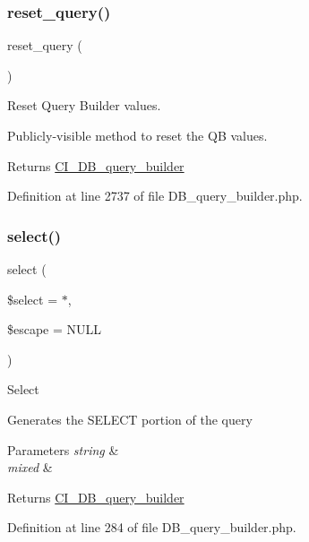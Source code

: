 \subsubsection{\texorpdfstring{reset\_query()}{reset\_query()}}
{\footnotesize\ttfamily reset\+\_\+query (\begin{DoxyParamCaption}{ }\end{DoxyParamCaption})}

Reset Query Builder values.

Publicly-\/visible method to reset the QB values.

\begin{DoxyReturn}{Returns}
\mbox{\hyperlink{class_c_i___d_b__query__builder}{C\+I\+\_\+\+D\+B\+\_\+query\+\_\+builder}} 
\end{DoxyReturn}


Definition at line 2737 of file D\+B\+\_\+query\+\_\+builder.\+php.

\mbox{\label{class_c_i___d_b__query__builder_a406a7ea81e717e56496f61baf3e03f44}} 
\subsubsection{\texorpdfstring{select()}{select()}}
{\footnotesize\ttfamily select (\begin{DoxyParamCaption}\item[{}]{\$select = {\ttfamily \textquotesingle{}$\ast$\textquotesingle{}},  }\item[{}]{\$escape = {\ttfamily NULL} }\end{DoxyParamCaption})}

Select

Generates the S\+E\+L\+E\+CT portion of the query


\begin{DoxyParams}{Parameters}
{\em string} & \\
\hline
{\em mixed} & \\
\hline
\end{DoxyParams}
\begin{DoxyReturn}{Returns}
\mbox{\hyperlink{class_c_i___d_b__query__builder}{C\+I\+\_\+\+D\+B\+\_\+query\+\_\+builder}} 
\end{DoxyReturn}


Definition at line 284 of file D\+B\+\_\+query\+\_\+builder.\+php.

